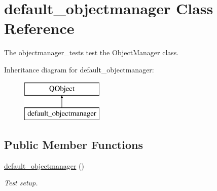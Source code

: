 \hypertarget{classdefault__objectmanager}{\section{default\-\_\-objectmanager Class Reference}
\label{classdefault__objectmanager}
}


The objectmanager\-\_\-tests test the Object\-Manager class.  


Inheritance diagram for default\-\_\-objectmanager\-:\begin{figure}[H]
\begin{center}
\leavevmode
\includegraphics[height=2.000000cm]{classdefault__objectmanager}
\end{center}
\end{figure}
\subsection*{Public Member Functions}
\begin{DoxyCompactItemize}
\item 
\hyperlink{classdefault__objectmanager_ab59752a56a4ac34bc869403fbfbf6af6}{default\-\_\-objectmanager} ()
\begin{DoxyCompactList}\small\item\em Test setup. \end{DoxyCompactList}\end{DoxyCompactItemize}
